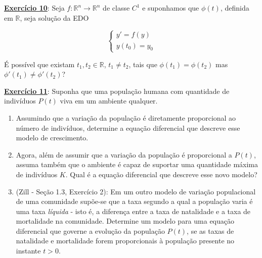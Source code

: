 \documentclass[oneside,12pt,a4paper]{report}
\begin{document}
    \noindent\textbf{\hyperlink{resp:ex10}{\hypertarget{quest:ex10}{Exercício 10}}}: Seja $f:\mathbb{R}^n \to \mathbb{R}^n$ de classe $C^1$ e suponhamos que $\phi(t)$, definida em $\mathbb{R}$, seja solução da EDO

    \[
    \begin{cases} 
    y' = f(y)\\ 
    y(t_0) = y_0
    \end{cases}
    \]

    \noindent É possível que existam $t_1, t_2 \in \mathbb{R}$, $t_1\neq t_2$, tais que $\phi(t_1) = \phi(t_2)$ mas $\phi'(t_1) \neq \phi'(t_2)$?
    \vspace{0.5cm}
    
    \noindent\textbf{\hyperlink{resp:ex11}{\hypertarget{quest:ex11}{Exercício 11}}}: Suponha que uma população humana com quantidade de indivíduos $P(t)$ viva em um ambiente qualquer.
    \begin{enumerate}[label=\alph*)]
        \item Assumindo que a variação da população é diretamente proporcional ao número de indivíduos, determine a equação diferencial que descreve esse modelo de crescimento.
        \item Agora, além de assumir que a variação da população é proporcional a $P(t)$, assuma também que o ambiente é capaz de suportar uma quantidade máxima de indivíduos $K$. Qual é a equação diferencial que descreve esse novo modelo?
        \item (Zill - Seção 1.3, Exercício 2): Em um outro modelo de variação populacional de uma comunidade supõe-se que a taxa segundo a qual a população varia é uma taxa \textit{líquida} - isto é, a diferença entre a taxa de natalidade e a taxa de mortalidade na comunidade. Determine um modelo para uma equação diferencial que governe a evolução da população $P(t)$, se as taxas de natalidade e mortalidade forem proporcionais à população presente no instante $t>0$.
    \end{enumerate}
    \vspace{0.5cm}
    
\end{document}
